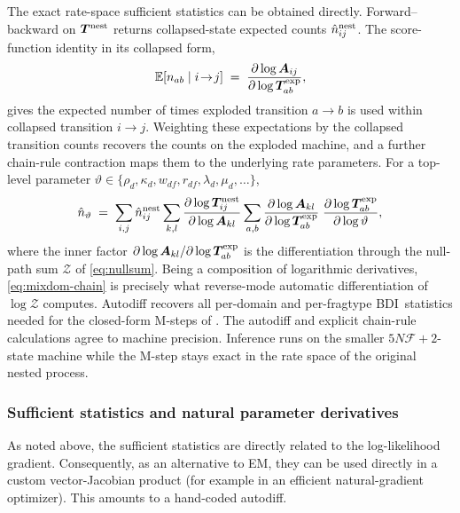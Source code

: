 \documentclass[11pt]{article}
\newcommand{\BDI}{\textsc{BDI}}
\newcommand{\E}{\mathbb{E}}
\newcommand{\ins}{\lambda}
\newcommand{\del}{\mu}
\newcommand{\Zsum}{\mathcal{Z}}
\newcommand{\Aeff}{\bm{A}}
\begin{document}
The exact rate-space sufficient statistics can be obtained directly. Forward--backward on $\bm{T}^{\rm nest}$
returns collapsed-state expected counts $\hat n^{\rm nest}_{ij}$. The
score-function identity in its collapsed form,
\begin{equation}
\label{eq:mixdom-score}
\E[n_{ab}\mid i\!\to\! j]
 \;=\; \frac{\partial\log \Aeff_{ij}}{\partial\log \bm{T}^{\rm exp}_{ab}},
\end{equation}
gives the expected number of times exploded transition $a\to b$ is used
within collapsed transition $i\to j$.
Weighting these expectations by the collapsed transition counts recovers 
the counts on the exploded machine, and a further chain-rule contraction 
maps them to the underlying rate parameters.
For a top-level parameter
$\vartheta\in\{\rho_d,\kappa_d,w_{df},r_{df},\ins_d,\del_d,\dots\}$,
\begin{equation}
\label{eq:mixdom-chain}
\hat n_\vartheta
 \;=\; \sum_{i,j} \hat n^{\rm nest}_{ij}
   \sum_{k,l}\frac{\partial\log \bm{T}^{\rm nest}_{ij}}
                  {\partial\log \Aeff_{kl}}
   \sum_{a,b}\frac{\partial\log \Aeff_{kl}}
                  {\partial\log \bm{T}^{\rm exp}_{ab}}\;
            \frac{\partial\log \bm{T}^{\rm exp}_{ab}}
                  {\partial\log\vartheta},
\end{equation}
where the inner factor $\partial\log\Aeff_{kl}/\partial\log\bm{T}^{\rm
exp}_{ab}$ is the differentiation through the null-path sum $\Zsum$ of
\eqref{eq:nullsum}. Being a composition of logarithmic derivatives,
\eqref{eq:mixdom-chain} is precisely what reverse-mode automatic
differentiation of $\log\Zsum$ computes.
Autodiff recovers all per-domain and per-fragtype \BDI\ statistics needed
for the closed-form M-steps of . 
The autodiff and explicit chain-rule calculations agree to machine precision.
Inference runs on the smaller $5N \mathcal F {+}2$-state
machine while the M-step stays exact in the rate space of the original
nested process.

\subsubsection{Sufficient statistics and natural parameter derivatives}

As noted above, the sufficient statistics are directly related
to the log-likelihood gradient. Consequently, as an alternative to EM, they can be used directly in a custom vector-Jacobian product (for example in an efficient natural-gradient optimizer).
This amounts to a hand-coded autodiff.
\end{document}
